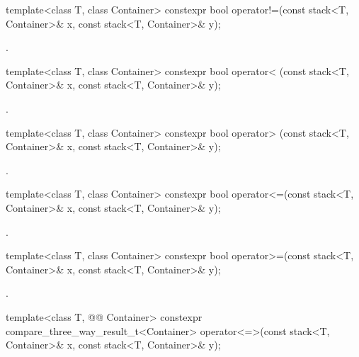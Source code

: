 %
\begin{itemdecl}
template<class T, class Container>
  constexpr bool operator!=(const stack<T, Container>& x, const stack<T, Container>& y);
\end{itemdecl}

\begin{itemdescr}
\pnum
\returns
{}.
\end{itemdescr}

%
\begin{itemdecl}
template<class T, class Container>
  constexpr bool operator< (const stack<T, Container>& x, const stack<T, Container>& y);
\end{itemdecl}

\begin{itemdescr}
\pnum
\returns
{}.
\end{itemdescr}

%
\begin{itemdecl}
template<class T, class Container>
  constexpr bool operator> (const stack<T, Container>& x, const stack<T, Container>& y);
\end{itemdecl}

\begin{itemdescr}
\pnum
\returns
{}.
\end{itemdescr}

%
\begin{itemdecl}
template<class T, class Container>
  constexpr bool operator<=(const stack<T, Container>& x, const stack<T, Container>& y);
\end{itemdecl}

\begin{itemdescr}
\pnum
\returns
{}.
\end{itemdescr}

%
\begin{itemdecl}
template<class T, class Container>
  constexpr bool operator>=(const stack<T, Container>& x, const stack<T, Container>& y);
\end{itemdecl}

\begin{itemdescr}
\pnum
\returns
{}.
\end{itemdescr}

%
\begin{itemdecl}
template<class T, @@ Container>
  constexpr compare_three_way_result_t<Container>
    operator<=>(const stack<T, Container>& x, const stack<T, Container>& y);
\end{itemdecl}

